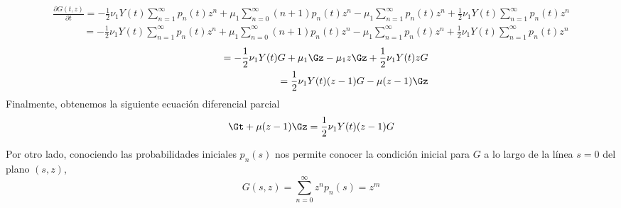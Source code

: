 \begin{eqnarray*}
   \frac{\partial G(t,z)}{\partial t} =-\frac{1}{2}\nu_1Y(t)\sum_{n=1}^\infty p_n(t)z^n +\mu_1\sum_{n=0}^\infty (n+1)p_n(t)z^n-\mu_1\sum_{n=1}^\infty p_n(t)z^n+\frac{1}{2}\nu_1Y(t)\sum_{n=1}^\infty p_n(t)z^n
\end{eqnarray*}
\begin{eqnarray*}
    \quad\quad\quad=-\frac{1}{2}\nu_1Y(t)\sum_{n=1}^\infty p_n(t)z^n+\mu_1\sum_{n=0}^\infty (n+1)p_n(t)z^n-\mu_1\sum_{n=1}^\infty p_n(t)z^n+\frac{1}{2}\nu_1Y(t)\sum_{n=1}^\infty p_n(t)z^n
\end{eqnarray*}
\begin{eqnarray*}
  \quad\quad\quad=-\frac{1}{2}\nu_1Y(t)G+\mu_1\Gz-\mu_1z\Gz+\frac{1}{2}\nu_1Y(t)z G\\=\frac{1}{2}\nu_1Y(t)(z-1)G-\mu(z-1)\Gz
\end{eqnarray*}
Finalmente, obtenemos la siguiente ecuación diferencial parcial
$$ \Gt+\mu(z-1)\Gz=\frac{1}{2}\nu_1Y(t)(z-1)G$$

Por otro lado, conociendo las probabilidades iniciales $p_n(s)$ nos permite conocer la condición inicial para $G$ a lo largo de la línea $s = 0$ del plano $(s, z)$,
$$G(s,z)=\sum_{n=0}^\infty z^n p_n(s)=z^m$$